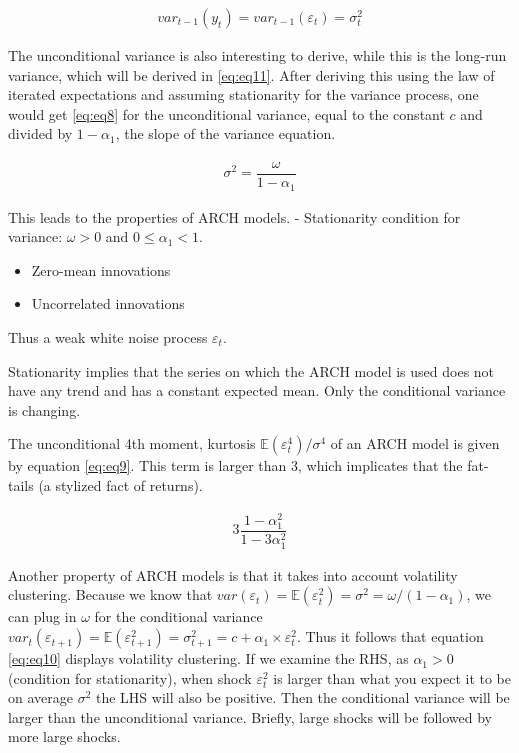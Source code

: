 \documentclass[a4paper, twoside]{templates/ociamthesis}
\begin{document}
\begin{align} 
var_{t-1}(y_t) = var_{t-1}(\varepsilon_t)= \sigma_t^2
 \label{eq:eq7}
\end{align}

\noindent The unconditional variance is also interesting to derive, while this is the long-run variance, which will be derived in \eqref{eq:eq11}. After deriving this using the law of iterated expectations and assuming stationarity for the variance process, one would get \eqref{eq:eq8} for the unconditional variance, equal to the constant \(c\) and divided by \(1-\alpha_1\), the slope of the variance equation.

\begin{align} 
\sigma^2 = \dfrac{\omega}{1-\alpha_1}
 \label{eq:eq8}
\end{align}

\noindent This leads to the properties of ARCH models. - Stationarity condition for variance: \(\omega>0\) and \(0 \le \alpha_1 < 1\).

\begin{itemize}
\item
  Zero-mean innovations
\item
  Uncorrelated innovations
\end{itemize}

\noindent Thus a weak white noise process \(\varepsilon_t\).

\noindent Stationarity implies that the series on which the ARCH model is used does not have any trend and has a constant expected mean. Only the conditional variance is changing.

\noindent The unconditional 4th moment, kurtosis \(\mathbb{E}(\varepsilon_t^4)/\sigma^4\) of an ARCH model is given by equation \eqref{eq:eq9}. This term is larger than 3, which implicates that the fat-tails (a stylized fact of returns).

\begin{align} 
3\dfrac{1-\alpha_1^2}{1-3\alpha_1^2}
 \label{eq:eq9}
\end{align}

\noindent Another property of ARCH models is that it takes into account volatility clustering. Because we know that \(var(\varepsilon_t) = \mathbb{E}(\varepsilon_t^2) = \sigma^2 = \omega/(1-\alpha_1)\), we can plug in \(\omega\) for the conditional variance \(var_t(\varepsilon_{t+1}) = \mathbb{E}(\varepsilon_{t+1}^2) = \sigma_{t+1}^2 = c + \alpha_1\times\varepsilon_t^2\). Thus it follows that equation \eqref{eq:eq10} displays volatility clustering. If we examine the RHS, as \(\alpha_1>0\) (condition for stationarity), when shock \(\varepsilon_t^2\) is larger than what you expect it to be on average \(\sigma^2\) the LHS will also be positive. Then the conditional variance will be larger than the unconditional variance. Briefly, large shocks will be followed by more large shocks.
\end{document}
